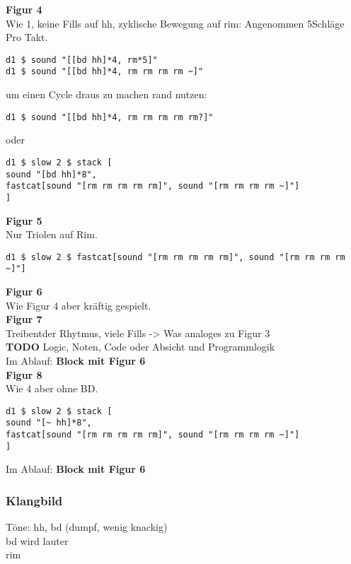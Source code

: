 \documentclass[
10pt, %
a4paper, %
oneside, %
headinclude,footinclude, %
BCOR5mm, %
]{scrartcl}
\begin{document}
\noindent \textbf{Figur 4}\\
Wie 1, keine Fills auf hh,
zyklische Bewegung auf rim: Angenommen 5Schläge Pro Takt.

\begin{lstlisting}
d1 $ sound "[[bd hh]*4, rm*5]"
d1 $ sound "[[bd hh]*4, rm rm rm rm ~]"
\end{lstlisting}

um einen Cycle draus zu machen rand nutzen:

\begin{lstlisting}
d1 $ sound "[[bd hh]*4, rm rm rm rm rm?]"
\end{lstlisting}

oder

\begin{lstlisting}
d1 $ slow 2 $ stack [
sound "[bd hh]*8",
fastcat[sound "[rm rm rm rm rm]", sound "[rm rm rm rm ~]"]
]
\end{lstlisting}

\noindent \textbf{Figur 5}\\
Nur Triolen auf Rim.
\begin{lstlisting}
d1 $ slow 2 $ fastcat[sound "[rm rm rm rm rm]", sound "[rm rm rm rm ~]"]
\end{lstlisting}


\noindent \textbf{Figur 6}\\
Wie Figur 4 aber kräftig gespielt.\\

\noindent \textbf{Figur 7}\\
Treibentder Rhytmus, viele Fills -> Was analoges zu Figur 3\\
{\color{red}\textbf{TODO}} Logic, Noten, Code oder Absicht und Programmlogik\\

\noindent Im Ablauf: \textbf{Block mit Figur 6}\\

\noindent \textbf{Figur 8}\\
Wie 4 aber ohne BD.
\begin{lstlisting}
d1 $ slow 2 $ stack [
sound "[~ hh]*8",
fastcat[sound "[rm rm rm rm rm]", sound "[rm rm rm rm ~]"]
]
\end{lstlisting}

\noindent Im Ablauf: \textbf{Block mit Figur 6}

\subsubsection{Klangbild}
Töne: hh, bd (dumpf, wenig knackig)\\
bd wird lauter\\
rim
\end{document}
